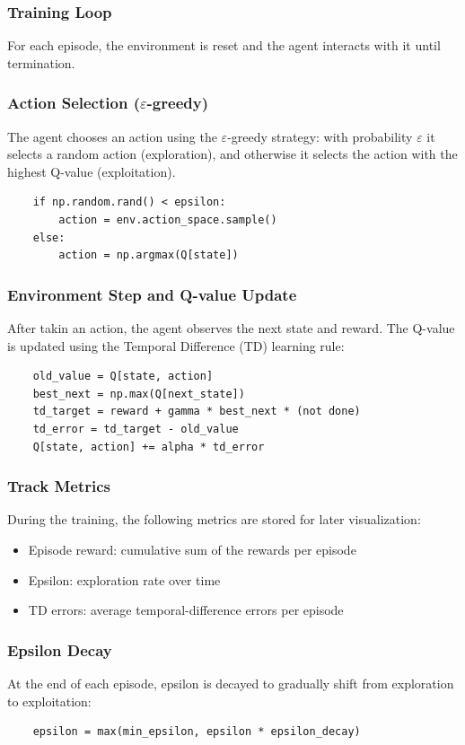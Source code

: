\documentclass[a4paper,12pt]{article}
\begin{document}
\subsubsection{Training Loop}
For each episode, the environment is reset and the agent interacts with it until termination.
\subsubsection{Action Selection ($\varepsilon$-greedy)}
The agent chooses an action using the $\varepsilon$-greedy strategy: with probability $\varepsilon$ it selects a random action (exploration), and otherwise it selects the action with the highest Q-value (exploitation).
\begin{lstlisting}
    if np.random.rand() < epsilon:
        action = env.action_space.sample()
    else:
        action = np.argmax(Q[state])
\end{lstlisting}
\subsubsection{Environment Step and Q-value Update}
After takin an action, the agent observes the next state and reward. The Q-value is updated using the Temporal Difference (TD) learning rule:
\begin{lstlisting}
    old_value = Q[state, action]
    best_next = np.max(Q[next_state])
    td_target = reward + gamma * best_next * (not done)
    td_error = td_target - old_value
    Q[state, action] += alpha * td_error
\end{lstlisting}
\subsubsection{Track Metrics}
During the training, the following metrics are stored for later visualization:
\begin{itemize}
    \item Episode reward: cumulative sum of the rewards per episode
    \item Epsilon: exploration rate over time
    \item TD errors: average temporal-difference errors per episode
\end{itemize}
\subsubsection{Epsilon Decay}
At the end of each episode, epsilon is decayed to gradually shift from exploration to exploitation:
\begin{lstlisting}
    epsilon = max(min_epsilon, epsilon * epsilon_decay)
\end{lstlisting}
\end{document}
